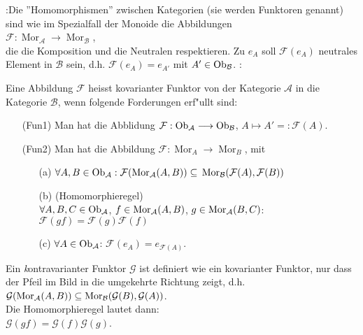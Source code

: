 :{Die ''Homomorphismen'' zwischen Kategorien 
(sie werden Funktoren genannt) sind wie im Spezialfall der Monoide
die Abbildungen\\
$\mathcal{F}: \operatorname{Mor}_{\mathcal{A}}\longrightarrow \operatorname{Mor}_{\mathcal{B}}$, \\
die die Komposition und die Neutralen respektieren. Zu $e_A$ soll
$\mathcal{F}(e_A)$ neutrales Element in $\mathcal{B}$ sein, d.h.
$\mathcal{F}(e_A)=e_{A'}$ mit $A' \in \operatorname{Ob}_{\mathcal{B}}$.}
:{Eine Abbildung $\mathcal{F}$ heisst kovarianter Funktor 
von der Kategorie $\mathcal{A}$ in die Kategorie $\mathcal{B}$, wenn folgende
Forderungen erf"ullt sind:
\begin{enumerate}
\item[(Fun1)] Man hat die Abblidung $\mathcal{F}: \operatorname{Ob}_{\mathcal{A}}\longrightarrow \operatorname{Ob}_{\mathcal{B}}$,
$A\mapsto A'=: \mathcal{F}(A)$.
\item[(Fun2)] Man hat die Abbildung $\mathcal{F}: \operatorname{Mor}_{A}
\longrightarrow \operatorname{Mor}_{B}$, mit
  \begin{enumerate}
  \item[(a)] $\forall A,B \in \Ob{A}: \mathcal{F}(\Mor(A;A;B)) \subseteq$
  $\Mor(B;\mathcal{F}(A);\mathcal{F}(B))$
  \item[(b)] (Homomorphieregel)\\
  $\forall A,B,C \in \operatorname{Ob}_{\mathcal{A}}$, $f\in \Mor(A;A;B)$, $g\in \Mor(A;B;C)$:
  $\mathcal{F}(gf)=\mathcal{F}(g) \mathcal{F}(f)$
  \item[(c)] $\forall A\in \operatorname{Ob}_{\mathcal{A}}$: $\mathcal{F}(e_A)=e_{\mathcal{F}(A)}$.
  \end{enumerate} 
\end{enumerate}
Ein {\emph kontravarianter} Funktor 
$\mathcal{G}$ ist definiert wie ein kovarianter
Funktor, nur dass der Pfeil im Bild in die umgekehrte Richtung zeigt, d.h.\\
$\mathcal{G}(\Mor(A;A;B)) \subseteq \Mor(B;\mathcal{G}(B);\mathcal{G}(A))$.\\
Die Homomorphieregel lautet dann:\\
$\mathcal{G}(gf)=\mathcal{G}(f)\mathcal{G}(g)$.
}
